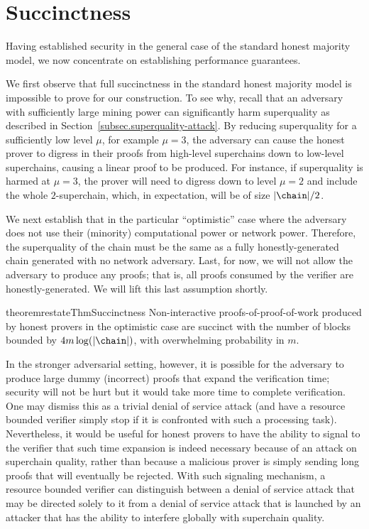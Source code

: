 \section{Succinctness}
\label{sec.succinctness}
Having established security in the general case of the standard honest majority
model, we now concentrate on establishing performance guarantees.

We first observe that full succinctness in the standard honest majority model is
impossible to prove for our construction. To see why, recall that an adversary
with sufficiently large mining power can significantly harm superquality as
described in %
Section~\ref{subsec.superquality-attack}. By reducing
 superquality for a sufficiently low level $\mu$, for example $\mu = 3$, the
adversary can cause the honest prover to digress in their proofs from high-level
superchains down to low-level superchains, causing a linear proof to be
produced.
For instance, if superquality is harmed at $\mu = 3$, the prover will
need to digress down to level $\mu = 2$ and include the whole $2$-superchain,
which, in expectation, will be of size $|\chain|/2$.

We next establish that in the particular
``optimistic'' case where the adversary does not use their (minority)
computational power or network power. Therefore, the superquality of the chain
must be the same as a fully honestly-generated chain generated with no network
adversary. Last, for now, we will not allow the adversary to produce any proofs;
that is, all proofs consumed by the verifier are honestly-generated.
We will lift this last assumption shortly.

\begin{restatable}{theorem}{restateThmSuccinctness}
    \label{thm.succinctness}
    Non-interactive proofs-of-proof-of-work produced by honest provers in the
    optimistic case are succinct with the number of blocks bounded by $4m
    \log(|\chain|)$, with overwhelming probability in $m$.
\end{restatable}

In the stronger adversarial setting, however, it is possible for the
adversary to produce large dummy (incorrect) proofs that
expand the verification time; security will not be hurt but it would take more time to complete verification. One may dismiss this as a trivial denial of
service attack (and have a resource bounded
verifier simply stop  if it is confronted with such a processing task).
%
Nevertheless, it would be useful for honest provers
to have the ability to signal to the
verifier that such time expansion is indeed necessary because
of an attack on superchain quality, rather than because
a malicious prover is simply sending long proofs that will eventually
be rejected. With such signaling mechanism, a resource bounded verifier can
distinguish between a denial of service attack that may be directed solely to it
from  a denial of service attack that  is launched by an attacker
that has the ability to  interfere globally with superchain quality.

